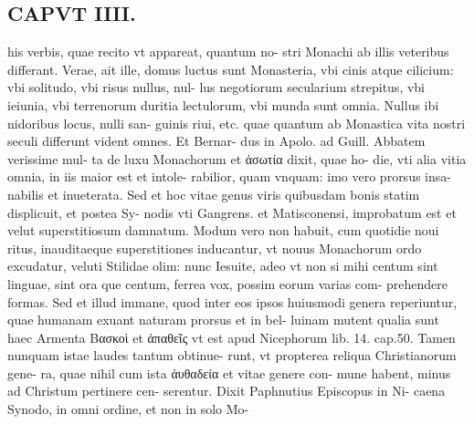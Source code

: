 \documentclass{article}
\begin{document}
\begin{pages}
\section*{CAPVT  IIII. }
\marginpar{[ p.217 ]}\pstart his verbis, quae recito vt appareat, quantum no- stri Monachi ab illis veteribus differant. Verae, ait ille, domus luctus sunt Monasteria, vbi cinis atque cilicium: vbi solitudo, vbi risus nullus, nul- lus negotiorum secularium strepitus, vbi ieiunia, vbi terrenorum duritia lectulorum, vbi munda sunt omnia. Nullus ibi nidoribus locus, nulli san- guinis riui, etc. quae quantum ab Monastica vita nostri seculi differunt vident omnes. Et Bernar- dus in Apolo. ad Guill. Abbatem verissime mul- ta de luxu Monachorum et ἀσωτία dixit, quae ho- die, vti alia vitia omnia, in iis maior est et intole- rabilior, quam vnquam: imo vero prorsus insa- nabilis et inueterata. Sed et hoc vitae genus viris quibusdam bonis statim displicuit, et postea Sy- nodis vti Gangrens. et Matisconensi, improbatum est et velut superstitiosum damnatum. Modum vero non habuit, cum quotidie noui ritus, inauditaeque superstitiones inducantur, vt nouus Monachorum ordo excudatur, veluti Stilidae olim: nunc Iesuite, adeo vt non si mihi centum sint linguae, sint ora que centum, ferrea vox, possim eorum varias com- prehendere formas. Sed et illud immane, quod inter eos ipsos huiusmodi genera reperiuntur, quae humanam exuant naturam prorsus et in bel- luinam mutent qualia sunt haec Armenta Bασκοὶ et ἀπαθεῖς vt est apud Nicephorum lib.  14. cap.50. Tamen nunquam istae laudes tantum obtinue- runt, vt propterea reliqua Christianorum gene- ra, quae nihil cum ista ἀυθαδεία et vitae genere con- mune habent, minus ad Christum pertinere cen- serentur. Dixit Paphnutius Episcopus in Ni- caena Synodo, in omni ordine, et non in solo Mo-  \pend

\end{pages}
\end{document}
